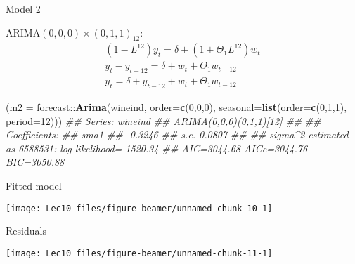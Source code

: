\documentclass[11pt,ignorenonframetext,]{beamer}
\newenvironment{Shaded}{}{}
\newcommand{\CommentTok}[1]{\textcolor[rgb]{0.38,0.63,0.69}{\textit{#1}}}
\newcommand{\DataTypeTok}[1]{\textcolor[rgb]{0.56,0.13,0.00}{#1}}
\newcommand{\DecValTok}[1]{\textcolor[rgb]{0.25,0.63,0.44}{#1}}
\newcommand{\KeywordTok}[1]{\textcolor[rgb]{0.00,0.44,0.13}{\textbf{#1}}}
\newcommand{\NormalTok}[1]{#1}
\newcommand{\OperatorTok}[1]{\textcolor[rgb]{0.40,0.40,0.40}{#1}}
\let\oldShaded\Shaded
\let\endoldShaded\endShaded
\renewenvironment{Shaded}{\footnotesize\begin{spacing}{0.9}\oldShaded}{\endoldShaded\end{spacing}}
\begin{document}
\begin{frame}[fragile]{Model 2}
\protect\hypertarget{model-2}{}

\(\text{ARIMA}(0,0,0) \times (0,1,1)_{12}\): \[
\begin{aligned}
(1-L^{12}) y_t = \delta + (1+\Theta_1 L^{12})  w_t \\
y_t-y_{t-12} = \delta + w_t + \Theta_1 w_{t-12} \\
y_t = \delta + y_{t-12} + w_t + \Theta_1 w_{t-12}
\end{aligned}
\]

\begin{Shaded}
\begin{Highlighting}[]
\NormalTok{(}\DataTypeTok{m2 =}\NormalTok{ forecast}\OperatorTok{::}\KeywordTok{Arima}\NormalTok{(wineind, }\DataTypeTok{order=}\KeywordTok{c}\NormalTok{(}\DecValTok{0}\NormalTok{,}\DecValTok{0}\NormalTok{,}\DecValTok{0}\NormalTok{), }
                      \DataTypeTok{seasonal=}\KeywordTok{list}\NormalTok{(}\DataTypeTok{order=}\KeywordTok{c}\NormalTok{(}\DecValTok{0}\NormalTok{,}\DecValTok{1}\NormalTok{,}\DecValTok{1}\NormalTok{), }\DataTypeTok{period=}\DecValTok{12}\NormalTok{)))}
\CommentTok{## Series: wineind }
\CommentTok{## ARIMA(0,0,0)(0,1,1)[12] }
\CommentTok{## }
\CommentTok{## Coefficients:}
\CommentTok{##          sma1}
\CommentTok{##       -0.3246}
\CommentTok{## s.e.   0.0807}
\CommentTok{## }
\CommentTok{## sigma^2 estimated as 6588531:  log likelihood=-1520.34}
\CommentTok{## AIC=3044.68   AICc=3044.76   BIC=3050.88}
\end{Highlighting}
\end{Shaded}

\end{frame}

\begin{frame}{Fitted model}
\protect\hypertarget{fitted-model-2}{}

\begin{center}\texttt{[image: Lec10\_files/figure-beamer/unnamed-chunk-10-1]} \end{center}

\end{frame}

\begin{frame}{Residuals}
\protect\hypertarget{residuals}{}

\begin{center}\texttt{[image: Lec10\_files/figure-beamer/unnamed-chunk-11-1]} \end{center}

\end{frame}
\end{document}
